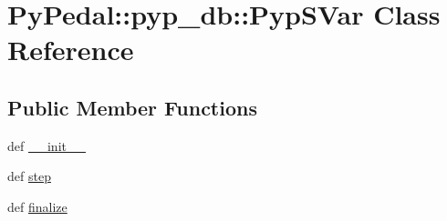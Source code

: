 \hypertarget{classPyPedal_1_1pyp__db_1_1PypSVar}{
\section{PyPedal::pyp\_\-db::PypSVar Class Reference}
\label{classPyPedal_1_1pyp__db_1_1PypSVar}
}
\subsection*{Public Member Functions}
\begin{CompactItemize}
\item 
\hypertarget{classPyPedal_1_1pyp__db_1_1PypSVar_656fe9736dcfe5dd2f14011fff766573}{
def \hyperlink{classPyPedal_1_1pyp__db_1_1PypSVar_656fe9736dcfe5dd2f14011fff766573}{\_\-\_\-init\_\-\_\-}}
\label{classPyPedal_1_1pyp__db_1_1PypSVar_656fe9736dcfe5dd2f14011fff766573}

\item 
\hypertarget{classPyPedal_1_1pyp__db_1_1PypSVar_d1b6f80d483a69113410b492ab4f0f32}{
def \hyperlink{classPyPedal_1_1pyp__db_1_1PypSVar_d1b6f80d483a69113410b492ab4f0f32}{step}}
\label{classPyPedal_1_1pyp__db_1_1PypSVar_d1b6f80d483a69113410b492ab4f0f32}

\item 
\hypertarget{classPyPedal_1_1pyp__db_1_1PypSVar_7cdaf08655e421a44d72851b171961b5}{
def \hyperlink{classPyPedal_1_1pyp__db_1_1PypSVar_7cdaf08655e421a44d72851b171961b5}{finalize}}
\label{classPyPedal_1_1pyp__db_1_1PypSVar_7cdaf08655e421a44d72851b171961b5}

\end{CompactItemize}

